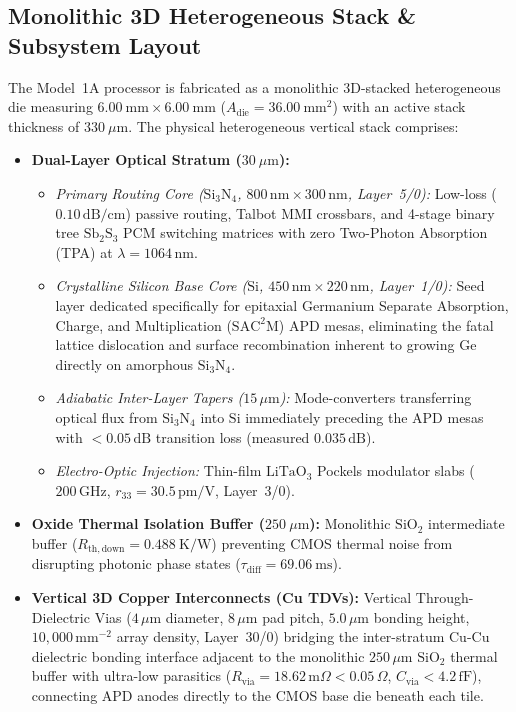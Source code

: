 \documentclass[journal]{IEEEtran}
\begin{document}
\subsection{Monolithic 3D Heterogeneous Stack \& Subsystem Layout}
The Model~1A processor is fabricated as a monolithic 3D-stacked heterogeneous die measuring $6.00~\mathrm{mm} \times 6.00~\mathrm{mm}$ ($A_{\mathrm{die}} = 36.00~\mathrm{mm^2}$) with an active stack thickness of $330~\mu\mathrm{m}$. The physical heterogeneous vertical stack comprises:
\begin{itemize}
    \item \textbf{Dual-Layer Optical Stratum ($30~\mu\mathrm{m}$):} 
    \begin{itemize}
        \item \emph{Primary Routing Core ($\mathrm{Si_3N_4}$, $800\,\mathrm{nm} \times 300\,\mathrm{nm}$, Layer~5/0):} Low-loss ($0.10\,\mathrm{dB/cm}$) passive routing, Talbot MMI crossbars, and 4-stage binary tree $\mathrm{Sb_2S_3}$ PCM switching matrices with zero Two-Photon Absorption (TPA) at $\lambda = 1064\,\mathrm{nm}$.
        \item \emph{Crystalline Silicon Base Core ($\mathrm{Si}$, $450\,\mathrm{nm} \times 220\,\mathrm{nm}$, Layer~1/0):} Seed layer dedicated specifically for epitaxial Germanium Separate Absorption, Charge, and Multiplication ($\mathrm{SAC^2M}$) APD mesas, eliminating the fatal lattice dislocation and surface recombination inherent to growing Ge directly on amorphous $\mathrm{Si_3N_4}$.
        \item \emph{Adiabatic Inter-Layer Tapers ($15\,\mu\mathrm{m}$):} Mode-converters transferring optical flux from $\mathrm{Si_3N_4}$ into $\mathrm{Si}$ immediately preceding the APD mesas with $<0.05\,\mathrm{dB}$ transition loss (measured $0.035\,\mathrm{dB}$).
        \item \emph{Electro-Optic Injection:} Thin-film $\mathrm{LiTaO_3}$ Pockels modulator slabs ($200\,\mathrm{GHz}$, $r_{33} = 30.5\,\mathrm{pm/V}$, Layer~3/0).
    \end{itemize}
    \item \textbf{Oxide Thermal Isolation Buffer ($250~\mu\mathrm{m}$):} Monolithic $\mathrm{SiO_2}$ intermediate buffer ($R_{\mathrm{th,down}} = 0.488~\mathrm{K/W}$) preventing CMOS thermal noise from disrupting photonic phase states ($\tau_{\mathrm{diff}} = 69.06~\mathrm{ms}$).
    \item \textbf{Vertical 3D Copper Interconnects (Cu TDVs):} Vertical Through-Dielectric Vias ($4\,\mu\mathrm{m}$ diameter, $8\,\mu\mathrm{m}$ pad pitch, $5.0\,\mu\mathrm{m}$ bonding height, $10,000\,\mathrm{mm^{-2}}$ array density, Layer~30/0) bridging the inter-stratum Cu-Cu dielectric bonding interface adjacent to the monolithic $250\,\mu\mathrm{m}$ $\mathrm{SiO_2}$ thermal buffer with ultra-low parasitics ($R_{\mathrm{via}} = 18.62\,\mathrm{m}\Omega < 0.05\,\Omega$, $C_{\mathrm{via}} < 4.2\,\mathrm{fF}$), connecting APD anodes directly to the CMOS base die beneath each tile.

\end{itemize}
\end{document}
